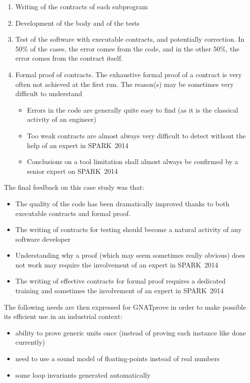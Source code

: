 \documentclass[10pt,a4paper,twocolumn]{article}
\newcommand{\gnatprove}{GNATprove\xspace}
\newcommand{\newspark}{SPARK~2014\xspace}
\begin{document}
\begin{enumerate}
\item Writing of the contracts of each subprogram
\item Development of the body and of the tests
\item Test of the software with executable contracts, and potentially correction.
			In 50\% of the cases, the error comes from the code, and in the other
			50\%, the error comes from the contract itself.
\item Formal proof of contracts.
			The exhaustive formal proof of a contract is very often not achieved at the first run.
			The reason(s) may be sometimes very difficult to understand
			\begin{itemize}
			\item Errors in the code are generally quite easy to find (as it is
						the classical activity of an engineer)
			\item Too weak contracts are almost always very difficult to detect without
						the help of an expert in \newspark
			\item Conclusions on a tool limitation shall almost always be confirmed by
						a senior expert on \newspark
			\end{itemize}
\end{enumerate}

The final feedback on this case study was that:
\begin{itemize}
\item The quality of the code has been dramatically improved thanks to both executable contracts and formal proof.
\item The writing of contracts for testing should become a natural activity of any software developer
\item Understanding why a proof (which may seem sometimes really obvious) does not work may require the involvement of an expert in \newspark
\item The writing of effective contracts for formal proof requires a dedicated training and sometimes the involvement of an expert in \newspark
\end{itemize}

The following needs are then expressed for \gnatprove in order to make possible its efficient use in an industrial context:
\begin{itemize}
\item ability to prove generic units once (instead of proving each instance like done currently)
\item need to use a sound model of floating-points instead of real numbers
\item some loop invariants generated automatically
\end{itemize}
\end{document}
